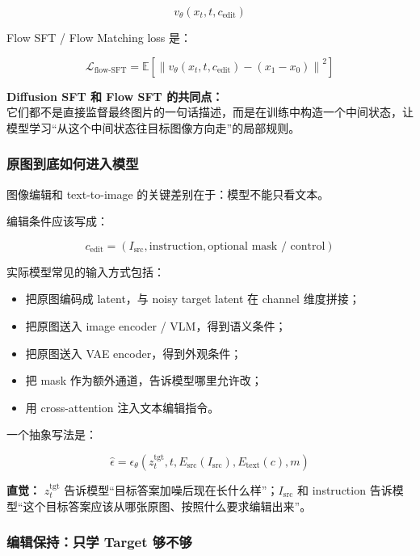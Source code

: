 \[
v_\theta(x_t,t,c_\text{edit})
\]

Flow SFT / Flow Matching loss 是：

\[
\mathcal{L}_\text{flow-SFT}
=
\mathbb{E}
\left[
\left\|
v_\theta(x_t,t,c_\text{edit})
-
(x_1-x_0)
\right\|^2
\right]
\]

\begin{summarybox}
\textbf{Diffusion SFT 和 Flow SFT 的共同点：}\\
它们都不是直接监督最终图片的一句话描述，而是在训练中构造一个中间状态，让模型学习“从这个中间状态往目标图像方向走”的局部规则。
\end{summarybox}

\subsubsection{原图到底如何进入模型}

图像编辑和 text-to-image 的关键差别在于：模型不能只看文本。

编辑条件应该写成：

\[
c_\text{edit}
=
\left(
I_\text{src},
\text{instruction},
\text{optional mask / control}
\right)
\]

实际模型常见的输入方式包括：

\begin{itemize}[leftmargin=1.5em]
  \item 把原图编码成 latent，与 noisy target latent 在 channel 维度拼接；
  \item 把原图送入 image encoder / VLM，得到语义条件；
  \item 把原图送入 VAE encoder，得到外观条件；
  \item 把 mask 作为额外通道，告诉模型哪里允许改；
  \item 用 cross-attention 注入文本编辑指令。
\end{itemize}

一个抽象写法是：

\[
\hat{\epsilon}
=
\epsilon_\theta
\left(
z_t^\text{tgt},
t,
E_\text{src}(I_\text{src}),
E_\text{text}(c),
m
\right)
\]

\begin{intubox}
\textbf{直觉：} $z_t^\text{tgt}$ 告诉模型“目标答案加噪后现在长什么样”；$I_\text{src}$ 和 instruction 告诉模型“这个目标答案应该从哪张原图、按照什么要求编辑出来”。
\end{intubox}

\subsubsection{编辑保持：只学 Target 够不够}

